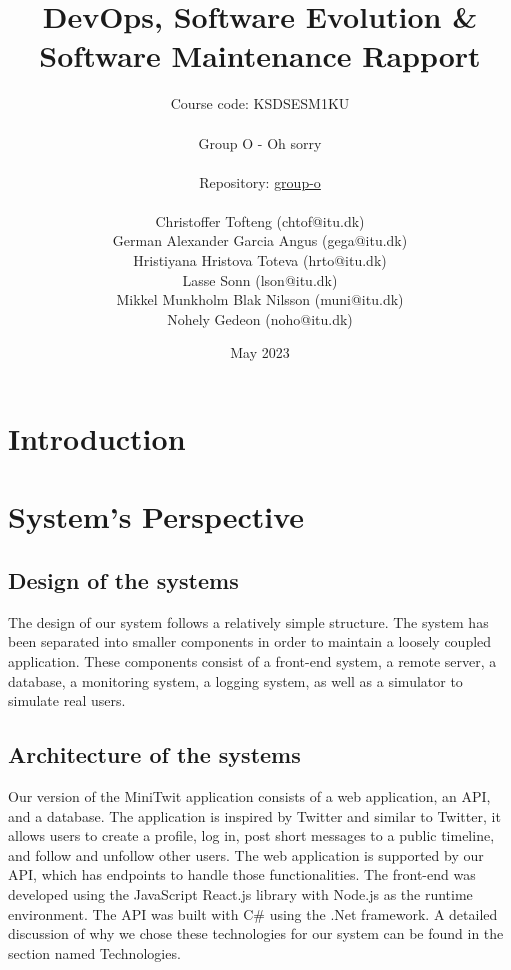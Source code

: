 \documentclass{article}
\title{DevOps, Software Evolution \& Software Maintenance Rapport}
\author{Course code: KSDSESM1KU\\\\
Group O - Oh sorry\\\\
Repository: \href{https://github.com/Group-O-Minitwit/minitwit-group-o}{group-o}
\\\\
Christoffer Tofteng (chtof@itu.dk)\\German Alexander Garcia Angus (gega@itu.dk)\\Hristiyana Hristova Toteva (hrto@itu.dk)\\Lasse Sonn (lson@itu.dk)\\Mikkel Munkholm Blak Nilsson (muni@itu.dk)\\Nohely Gedeon (noho@itu.dk)}
\date{May 2023}
\begin{document}
\maketitle
\newpage
\tableofcontents
\newpage

\section{Introduction}
\section{System's Perspective}
\subsection{Design of the systems}
The design of our system follows a relatively simple structure. The system has been separated into smaller components in order to maintain a loosely coupled application. These components consist of a front-end system, a remote server, a database, a monitoring system, a logging system, as well as a simulator to simulate real users. 
\subsection{Architecture of the systems} 
Our version of the MiniTwit application consists of a web application, an API, and a database. The application is inspired by Twitter and similar to Twitter, it allows users to create a profile, log in, post short messages to a public timeline, and follow and unfollow other users. The web application is supported by our API, which has endpoints to handle those functionalities. The front-end was developed using the JavaScript React.js library with Node.js as the runtime environment. The API was built with C\# using the .Net framework. A detailed discussion of why we chose these technologies for our system can be found in the section named Technologies.
\end{document}
